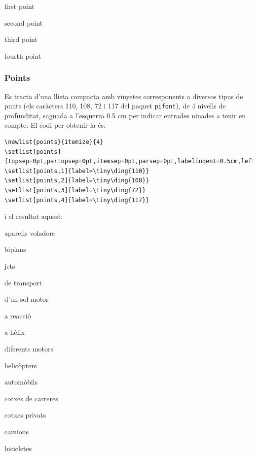 \documentclass[a4paper,
                             twoside,
                             BCOR1.0cm,
                             DIV11,
                             parskip=full,
                             11pt]{scrbook}
\begin{document}
\begin{attention}
\item  first point
\item second point
\item third point
\item fourth point
\end{attention}

\subsubsection{Points}\label{ssbsec:points}
Es tracta d'una llista compacta amb vinyetes corresponents a diversos tipus de punts (els caràcters 110, 108, 72 i 117 del paquet \verb+pifont+), de 4 nivells de profunditat,  sagnada a l'esquerra 0.5 cm per indicar  entrades niuades a tenir en compte. El codi per obtenir-la és:
\begin{tiny}
\begin{verbatim}
\newlist{points}{itemize}{4}
\setlist[points]{topsep=0pt,partopsep=0pt,itemsep=0pt,parsep=0pt,labelindent=0.5cm,leftmargin=*}
\setlist[points,1]{label=\tiny\ding{110}}
\setlist[points,2]{label=\tiny\ding{108}}
\setlist[points,3]{label=\tiny\ding{72}}
\setlist[points,4]{label=\tiny\ding{117}}
\end{verbatim}
\end{tiny}
i el resultat aquest:
\begin{points}
\item aparells voladors
	\begin{points}
		\item biplans
		\item jets
		\item de transport
			\begin{points}
				\item d'un sol motor
					\begin{points}
						\item a reacció
						\item a hèlix
					\end{points}
				\item diferents motors
			\end{points}
		\item helicòpters
	\end{points}
\item automòbils
	\begin{points}
		\item cotxes de carreres
		\item cotxes privats
		\item camions
\end{points}
\item bicicletes
\end{points}
\end{document}
